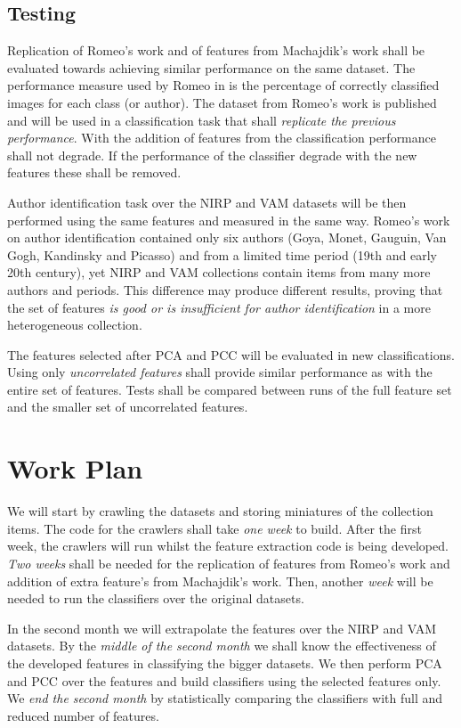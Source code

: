 \documentclass[a4paper,twocolumn]{article}
\begin{document}
\subsection{Testing}

Replication of Romeo's work and of features from Machajdik's work shall be
evaluated towards achieving similar performance on the same dataset.  The
performance measure used by Romeo in \cite{jma12clas} is the percentage of
correctly classified images for each class (or author).  The dataset from
Romeo's work is published and will be used in a classification task that shall
\emph{replicate the previous performance}.  With the addition of features from
\cite{mach10clas} the classification performance shall not degrade.  If the
performance of the classifier degrade with the new features these shall be
removed.

Author identification task over the NIRP and VAM datasets will be then
performed using the same features and measured in the same way.  Romeo's work
on author identification contained only six authors (Goya, Monet, Gauguin, Van
Gogh, Kandinsky and Picasso) and from a limited time period (19th and early
20th century), yet NIRP and VAM collections contain items from many more
authors and periods.  This difference may produce different results, proving
that the set of features \emph{is good or is insufficient for author
identification} in a more heterogeneous collection.

The features selected after PCA and PCC will be evaluated in new
classifications.  Using only \emph{uncorrelated features} shall provide similar
performance as with the entire set of features.  Tests shall be compared
between runs of the full feature set and the smaller set of uncorrelated
features.

\section{Work Plan}

We will start by crawling the datasets and storing miniatures of the collection
items.  The code for the crawlers shall take \emph{one week} to build.  After
the first week, the crawlers will run whilst the feature extraction code is
being developed.  \emph{Two weeks} shall be needed for the replication of
features from Romeo's work and addition of extra feature's from Machajdik's
work.  Then, another \emph{week} will be needed to run the classifiers over the
original datasets.

In the second month we will extrapolate the features over the NIRP and VAM
datasets.  By the \emph{middle of the second month} we shall know the
effectiveness of the developed features in classifying the bigger datasets.  We
then perform PCA and PCC over the features and build classifiers using the
selected features only.  We \emph{end the second month} by statistically
comparing the classifiers with full and reduced number of features.
\end{document}

